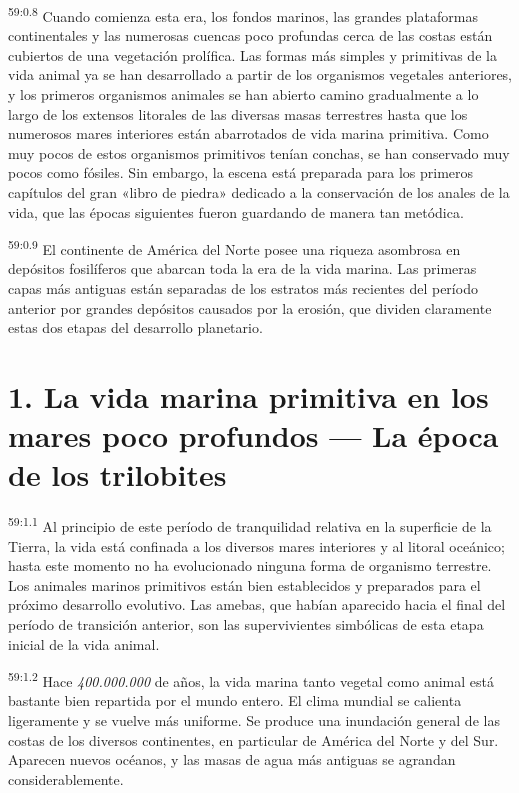 \par
\textsuperscript{59:0.8} Cuando comienza esta era, los fondos marinos, las grandes plataformas continentales y las numerosas cuencas poco profundas cerca de las costas están cubiertos de una vegetación prolífica. Las formas más simples y primitivas de la vida animal ya se han desarrollado a partir de los organismos vegetales anteriores, y los primeros organismos animales se han abierto camino gradualmente a lo largo de los extensos litorales de las diversas masas terrestres hasta que los numerosos mares interiores están abarrotados de vida marina primitiva. Como muy pocos de estos organismos primitivos tenían conchas, se han conservado muy pocos como fósiles. Sin embargo, la escena está preparada para los primeros capítulos del gran «libro de piedra» dedicado a la conservación de los anales de la vida, que las épocas siguientes fueron guardando de manera tan metódica.

\par
\textsuperscript{59:0.9} El continente de América del Norte posee una riqueza asombrosa en depósitos fosilíferos que abarcan toda la era de la vida marina. Las primeras capas más antiguas están separadas de los estratos más recientes del período anterior por grandes depósitos causados por la erosión, que dividen claramente estas dos etapas del desarrollo planetario.

\section*{1. La vida marina primitiva en los mares poco profundos --- La época de los trilobites}
\par
\textsuperscript{59:1.1} Al principio de este período de tranquilidad relativa en la superficie de la Tierra, la vida está confinada a los diversos mares interiores y al litoral oceánico; hasta este momento no ha evolucionado ninguna forma de organismo terrestre. Los animales marinos primitivos están bien establecidos y preparados para el próximo desarrollo evolutivo. Las amebas, que habían aparecido hacia el final del período de transición anterior, son las supervivientes simbólicas de esta etapa inicial de la vida animal.

\par
\textsuperscript{59:1.2} Hace \textit{400.000.000} de años, la vida marina tanto vegetal como animal está bastante bien repartida por el mundo entero. El clima mundial se calienta ligeramente y se vuelve más uniforme. Se produce una inundación general de las costas de los diversos continentes, en particular de América del Norte y del Sur. Aparecen nuevos océanos, y las masas de agua más antiguas se agrandan considerablemente.

